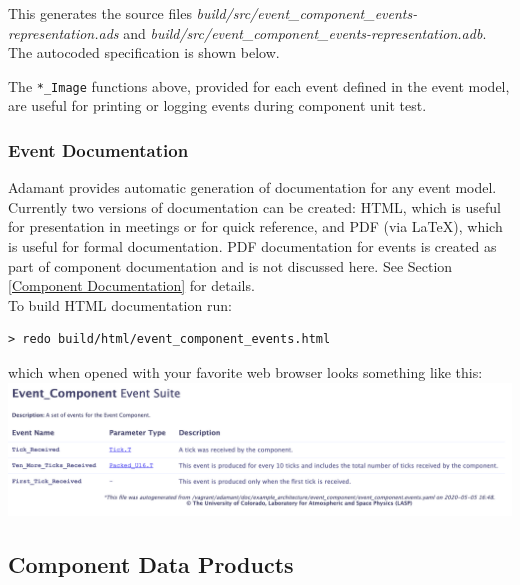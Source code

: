 This generates the source files \textit{build/src/event\_component\_events-representation.ads} and \textit{build/src/event\_component\_events-representation.adb}. The autocoded specification is shown below.


The \texttt{*\_Image} functions above, provided for each event defined in the event model, are useful for printing or logging events during component unit test.

\subsubsection{Event Documentation}

Adamant provides automatic generation of documentation for any event model. Currently two versions of documentation can be created: HTML, which is useful for presentation in meetings or for quick reference, and PDF (via \LaTeX), which is useful for formal documentation. PDF documentation for events is created as part of component documentation and is not discussed here. See Section \ref{Component Documentation} for details. \\

To build HTML documentation run:

\vspace{5mm} %
\begin{verbatim}
> redo build/html/event_component_events.html
\end{verbatim}
\vspace{5mm} %

which when opened with your favorite web browser looks something like this: \\

\vspace{5mm} %
\includegraphics[width=\textwidth]{images/eventshtml.png}
\vspace{5mm} %

\subsection{Component Data Products}


